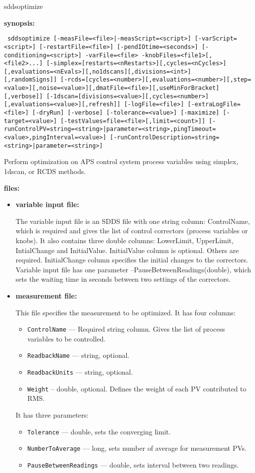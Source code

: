 \begin{sddsprog}{sddsoptimize}
\item {\bf synopsis:}
\begin{flushleft}{\tt
sddsoptimize [-measFile=<file>|-measScript=<script>] [-varScript=<script>]\
[-restartFile=<file>] [-pendIOtime=<seconds>] [-conditioning=<script>]\
-varFile=<file> -knobFiles=<file1>[,<file2>...]\
[-simplex=[restarts=<nRestarts>][,cycles=<nCycles>][,evaluations=<nEvals>][,no1dscans][,divisions=<int>][,randomSigns]]\
[-rcds=[cycles=<number>][,evaluations=<number>][,step=<value>][,noise=<value>][,dmatFile=<file>][,useMinForBracket][,verbose]]\
[-1dscan=[divisions=<value>][,cycles=<number>][,evaluations=<value>][,refresh]]\
[-logFile=<file>] [-extraLogFile=<file>] [-dryRun] [-verbose] [-tolerance=<value>] [-maximize]\
[-target=<value>] [-testValues=file=<file>[,limit=<count>]]\
[-runControlPV={string=<string>|parameter=<string>},pingTimeout=<value>,pingInterval=<value>]\
[-runControlDescription={string=<string>|parameter=<string>}]
}\end{flushleft}
Perform optimization on APS control system process variables using simplex, 1dscan, or RCDS methods.
\item {\bf files:}
\begin{itemize}
\item {\bf variable input file:} \par
The variable input file is an SDDS file with one string column: ControlName, which is required
and gives the list of control correctors (process variables or knobs). It also contains three
double columns: LowerLimit, UpperLimit, IntialChange and InitialValue. InitialValue column
is optional. Others are required. InitialChange column specifies the initial changes to the correctors.
Variable input file has one parameter --PauseBetweenReadings(double), which sets the waiting time in
seconds between two settings of the correctors.
\item {\bf measurement file:} \par This file specifies the measurement to be optimized. 
It has four columns:
\begin{itemize}
        \item {\tt ControlName} --- Required string column. Gives the list of process variables
                 to be controlled.
        \item {\tt ReadbackName} --- string, optional.
        \item {\tt ReadbackUnits} --- string, optional.
        \item {\tt Weight} -- double, optional. Defines the weight of each PV contributed to RMS.
\end{itemize}
It has three parameters: 
\begin{itemize}
        \item {\tt Tolerance} --- double, sets the converging limit.
        \item {\tt NumberToAverage} --- long, sets number of average for measurement PVs.
        \item {\tt PauseBetweenReadings} --- double, sets interval between two readings.


\end{itemize}
\end{itemize}
\end{sddsprog}
